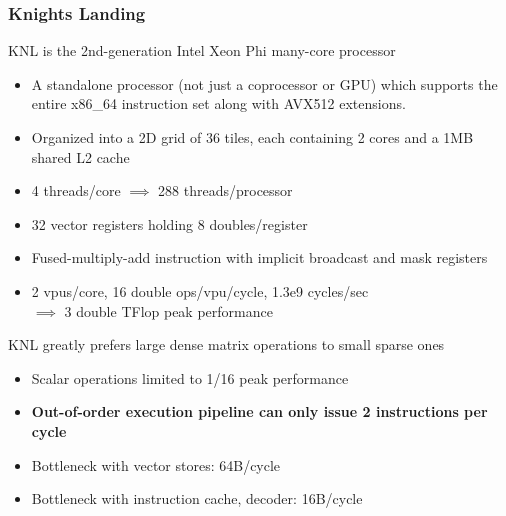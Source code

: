 \documentclass[9pt]{beamer}
\begin{document}
\begin{frame}
  \frametitle{Knights Landing}
  \begin{block}{KNL is the 2nd-generation Intel Xeon Phi many-core processor}
    \begin{itemize}
    \item A standalone processor (not just a coprocessor or GPU) which supports the entire x86\_64 instruction set along with AVX512 extensions.
    \item Organized into a 2D grid of 36 tiles, each containing 2 cores and a 1MB shared L2 cache
    \item 4 threads/core $\implies$ 288 threads/processor
    \item 32 vector registers holding 8 doubles/register
    \item Fused-multiply-add instruction with implicit broadcast and mask registers
    \item 2 vpus/core, 16 double ops/vpu/cycle, 1.3e9 cycles/sec \\ $\implies$ 3 double TFlop peak performance

    \end{itemize}
  \end{block}
  \begin{block}{KNL greatly prefers large dense matrix operations to small sparse ones}
    \begin{itemize}
    \item Scalar operations limited to 1/16 peak performance
    \item \textbf{Out-of-order execution pipeline can only issue 2 instructions per cycle}
    \item Bottleneck with vector stores: 64B/cycle
    \item Bottleneck with instruction cache, decoder: 16B/cycle
    \end{itemize}
  \end{block}
\end{frame}
\end{document}
